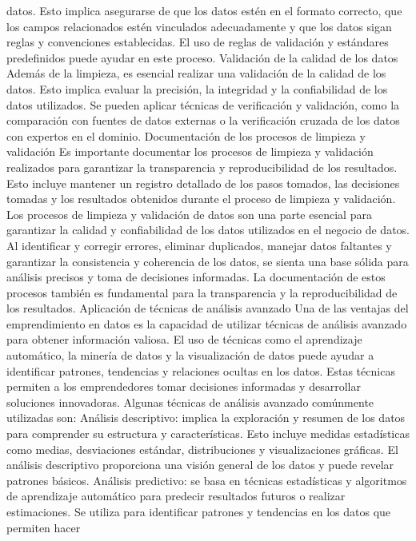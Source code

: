 \documentclass[
  letterpaper,
  DIV=11,
  numbers=noendperiod]{scrreprt}
\begin{document}
datos. Esto implica asegurarse de que los datos estén en el formato
correcto, que los campos relacionados estén vinculados adecuadamente y
que los datos sigan reglas y convenciones establecidas. El uso de reglas
de validación y estándares predefinidos puede ayudar en este proceso.
Validación de la calidad de los datos Además de la limpieza, es esencial
realizar una validación de la calidad de los datos. Esto implica evaluar
la precisión, la integridad y la confiabilidad de los datos utilizados.
Se pueden aplicar técnicas de verificación y validación, como la
comparación con fuentes de datos externas o la verificación cruzada de
los datos con expertos en el dominio. Documentación de los procesos de
limpieza y validación Es importante documentar los procesos de limpieza
y validación realizados para garantizar la transparencia y
reproducibilidad de los resultados. Esto incluye mantener un registro
detallado de los pasos tomados, las decisiones tomadas y los resultados
obtenidos durante el proceso de limpieza y validación. Los procesos de
limpieza y validación de datos son una parte esencial para garantizar la
calidad y confiabilidad de los datos utilizados en el negocio de datos.
Al identificar y corregir errores, eliminar duplicados, manejar datos
faltantes y garantizar la consistencia y coherencia de los datos, se
sienta una base sólida para análisis precisos y toma de decisiones
informadas. La documentación de estos procesos también es fundamental
para la transparencia y la reproducibilidad de los resultados.
Aplicación de técnicas de análisis avanzado Una de las ventajas del
emprendimiento en datos es la capacidad de utilizar técnicas de análisis
avanzado para obtener información valiosa. El uso de técnicas como el
aprendizaje automático, la minería de datos y la visualización de datos
puede ayudar a identificar patrones, tendencias y relaciones ocultas en
los datos. Estas técnicas permiten a los emprendedores tomar decisiones
informadas y desarrollar soluciones innovadoras. Algunas técnicas de
análisis avanzado comúnmente utilizadas son: Análisis descriptivo:
implica la exploración y resumen de los datos para comprender su
estructura y características. Esto incluye medidas estadísticas como
medias, desviaciones estándar, distribuciones y visualizaciones
gráficas. El análisis descriptivo proporciona una visión general de los
datos y puede revelar patrones básicos. Análisis predictivo: se basa en
técnicas estadísticas y algoritmos de aprendizaje automático para
predecir resultados futuros o realizar estimaciones. Se utiliza para
identificar patrones y tendencias en los datos que permiten hacer
\end{document}
